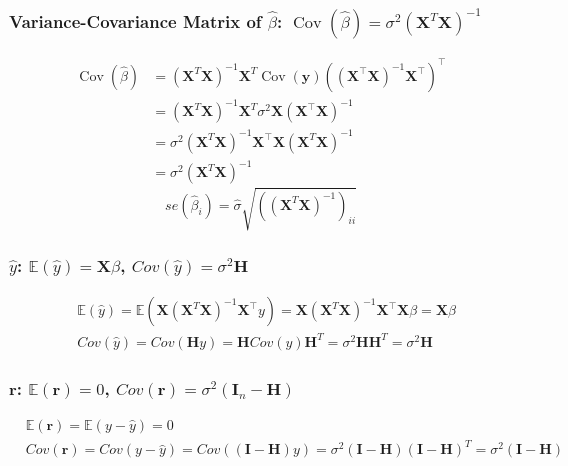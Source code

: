 \documentclass[11pt,a4paper]{article}
\begin{document}
\subsubsection{Variance-Covariance Matrix of $\hat{\beta}$: $\operatorname{Cov}(\hat{\beta})=\sigma^{2}\left(\mathbf{X}^{T} \mathbf{X}\right)^{-1}$}
$$\begin{aligned} \operatorname{Cov}(\hat{\beta}) &=\left(\mathbf{X}^{T} \mathbf{X}\right)^{-1} \mathbf{X}^{T} \operatorname{Cov}(\mathbf{y})\left(\left(\mathbf{X}^{\top} \mathbf{X}\right)^{-1} \mathbf{X}^{\top}\right)^{\top} \\ &=\left(\mathbf{X}^{T} \mathbf{X}\right)^{-1} \mathbf{X}^{T} \sigma^{2} \mathbf{X}\left(\mathbf{X}^{\top} \mathbf{X}\right)^{-1} \\ &=\sigma^{2}\left(\mathbf{X}^{T} \mathbf{X}\right)^{-1} \mathbf{X}^{\top} \mathbf{X}\left(\mathbf{X}^{T} \mathbf{X}\right)^{-1} \\ &=\sigma^{2}\left(\mathbf{X}^{T} \mathbf{X}\right)^{-1} \end{aligned}$$
$$se(\hat{\beta}_i)=\hat{\sigma}\sqrt{((\mathbf{X}^T\mathbf{X})^{-1})_{ii}}$$


\subsubsection{$\hat{y}$: $\mathbb{E}(\hat{y})=\mathbf{X}\beta$, $Cov(\hat{y})=\sigma^2 \mathbf{H}$}
\begin{equation}
    \begin{aligned}
        &\mathbb{E}(\hat{y})=\mathbb{E}(\mathbf{X}\left(\mathbf{X}^{T} \mathbf{X}\right)^{-1} \mathbf{X}^{\top}y)=\mathbf{X}\left(\mathbf{X}^{T} \mathbf{X}\right)^{-1} \mathbf{X}^{\top}\mathbf{X}\beta=\mathbf{X}\beta\\
        &Cov(\hat{y})=Cov(\mathbf{H}y)=\mathbf{H}Cov(y)\mathbf{H}^T=\sigma^2\mathbf{H}\mathbf{H}^T=\sigma^2\mathbf{H}
    \end{aligned}
    \nonumber
\end{equation}
\subsubsection{$\mathbf{r}$: $\mathbb{E}(\mathbf{r})=0$, $Cov(\mathbf{r})=\sigma^2 (\mathbf{I}_n-\mathbf{H})$}
\begin{equation}
    \begin{aligned}
        &\mathbb{E}(\mathbf{r})=\mathbb{E}(y-\hat{y})=0\\
        &Cov(\mathbf{r})=Cov(y-\hat{y})=Cov((\mathbf{I}-\mathbf{H})y)=\sigma^2(\mathbf{I}-\mathbf{H})(\mathbf{I}-\mathbf{H})^T=\sigma^2(\mathbf{I}-\mathbf{H})
    \end{aligned}
    \nonumber
\end{equation}
\end{document}
